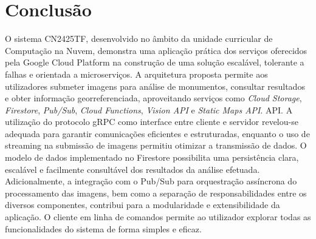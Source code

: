 \chapter{Conclusão}
\label{sec:conclusion}

O sistema CN2425TF, desenvolvido no âmbito da unidade curricular de Computação
na Nuvem, demonstra uma aplicação prática dos serviços oferecidos pela Google
Cloud Platform na construção de uma solução escalável, tolerante a falhas e
orientada a microserviços. A arquitetura proposta permite aos utilizadores
submeter imagens para análise de monumentos, consultar resultados e obter
informação georreferenciada, aproveitando serviços como \textit{Cloud Storage},
\textit{Firestore}, \textit{Pub/Sub}, \textit{Cloud Functions}, \textit{Vision
    API} e \textit{Static Maps API}. API. A utilização do protocolo gRPC como
interface entre cliente e servidor revelou-se adequada para garantir
comunicações eficientes e estruturadas, enquanto o uso de streaming na
submissão de imagens permitiu otimizar a transmissão de dados. O modelo de
dados implementado no Firestore possibilita uma persistência clara, escalável e
facilmente consultável dos resultados da análise efetuada. Adicionalmente, a
integração com o Pub/Sub para orquestração assíncrona do processamento das
imagens, bem como a separação de responsabilidades entre os diversos
componentes, contribui para a modularidade e extensibilidade da aplicação. O
cliente em linha de comandos permite ao utilizador explorar todas as
funcionalidades do sistema de forma simples e eficaz.

